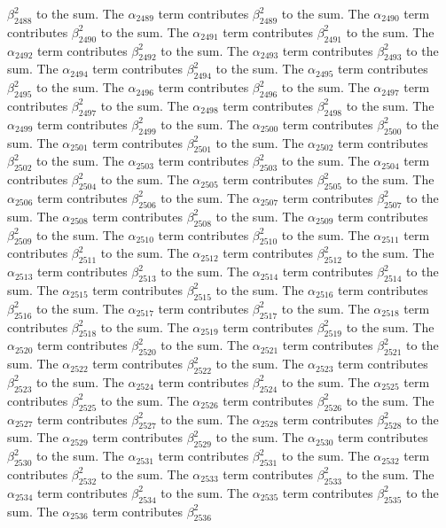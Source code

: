 \begin{lemma}
$\beta_{2488}^{2}$ to the sum. The $\alpha_{2489}$ term contributes $\beta_{2489}^{2}$ to the sum. The $\alpha_{2490}$ term contributes $\beta_{2490}^{2}$ to the sum. The $\alpha_{2491}$ term contributes $\beta_{2491}^{2}$ to the sum. The $\alpha_{2492}$ term contributes $\beta_{2492}^{2}$ to the sum. The $\alpha_{2493}$ term contributes $\beta_{2493}^{2}$ to the sum. The $\alpha_{2494}$ term contributes $\beta_{2494}^{2}$ to the sum. The $\alpha_{2495}$ term contributes $\beta_{2495}^{2}$ to the sum. The $\alpha_{2496}$ term contributes $\beta_{2496}^{2}$ to the sum. The $\alpha_{2497}$ term contributes $\beta_{2497}^{2}$ to the sum. The $\alpha_{2498}$ term contributes $\beta_{2498}^{2}$ to the sum. The $\alpha_{2499}$ term contributes $\beta_{2499}^{2}$ to the sum. The $\alpha_{2500}$ term contributes $\beta_{2500}^{2}$ to the sum. The $\alpha_{2501}$ term contributes $\beta_{2501}^{2}$ to the sum. The $\alpha_{2502}$ term contributes $\beta_{2502}^{2}$ to the sum. The $\alpha_{2503}$ term contributes $\beta_{2503}^{2}$ to the sum. The $\alpha_{2504}$ term contributes $\beta_{2504}^{2}$ to the sum. The $\alpha_{2505}$ term contributes $\beta_{2505}^{2}$ to the sum. The $\alpha_{2506}$ term contributes $\beta_{2506}^{2}$ to the sum. The $\alpha_{2507}$ term contributes $\beta_{2507}^{2}$ to the sum. The $\alpha_{2508}$ term contributes $\beta_{2508}^{2}$ to the sum. The $\alpha_{2509}$ term contributes $\beta_{2509}^{2}$ to the sum. The $\alpha_{2510}$ term contributes $\beta_{2510}^{2}$ to the sum. The $\alpha_{2511}$ term contributes $\beta_{2511}^{2}$ to the sum. The $\alpha_{2512}$ term contributes $\beta_{2512}^{2}$ to the sum. The $\alpha_{2513}$ term contributes $\beta_{2513}^{2}$ to the sum. The $\alpha_{2514}$ term contributes $\beta_{2514}^{2}$ to the sum. The $\alpha_{2515}$ term contributes $\beta_{2515}^{2}$ to the sum. The $\alpha_{2516}$ term contributes $\beta_{2516}^{2}$ to the sum. The $\alpha_{2517}$ term contributes $\beta_{2517}^{2}$ to the sum. The $\alpha_{2518}$ term contributes $\beta_{2518}^{2}$ to the sum. The $\alpha_{2519}$ term contributes $\beta_{2519}^{2}$ to the sum. The $\alpha_{2520}$ term contributes $\beta_{2520}^{2}$ to the sum. The $\alpha_{2521}$ term contributes $\beta_{2521}^{2}$ to the sum. The $\alpha_{2522}$ term contributes $\beta_{2522}^{2}$ to the sum. The $\alpha_{2523}$ term contributes $\beta_{2523}^{2}$ to the sum. The $\alpha_{2524}$ term contributes $\beta_{2524}^{2}$ to the sum. The $\alpha_{2525}$ term contributes $\beta_{2525}^{2}$ to the sum. The $\alpha_{2526}$ term contributes $\beta_{2526}^{2}$ to the sum. The $\alpha_{2527}$ term contributes $\beta_{2527}^{2}$ to the sum. The $\alpha_{2528}$ term contributes $\beta_{2528}^{2}$ to the sum. The $\alpha_{2529}$ term contributes $\beta_{2529}^{2}$ to the sum. The $\alpha_{2530}$ term contributes $\beta_{2530}^{2}$ to the sum. The $\alpha_{2531}$ term contributes $\beta_{2531}^{2}$ to the sum. The $\alpha_{2532}$ term contributes $\beta_{2532}^{2}$ to the sum. The $\alpha_{2533}$ term contributes $\beta_{2533}^{2}$ to the sum. The $\alpha_{2534}$ term contributes $\beta_{2534}^{2}$ to the sum. The $\alpha_{2535}$ term contributes $\beta_{2535}^{2}$ to the sum. The $\alpha_{2536}$ term contributes $\beta_{2536}^{2}$ 
\end{lemma}
